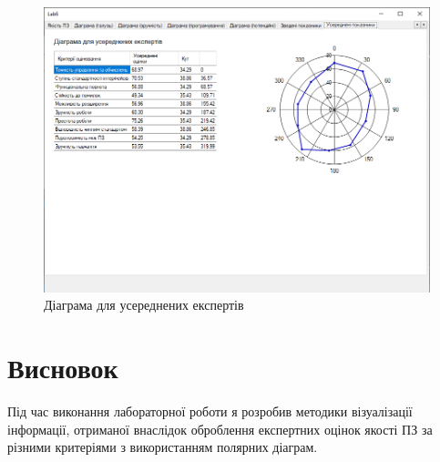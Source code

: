 \documentclass[14pt]{extreport}
\begin{document}
\begin{normalsize}
\begin{figure}[H]
	\centering
	\includegraphics[scale=0.55]{10}
	\caption{Діаграма для усереднених експертів}
\end{figure}

	
	\section*{Висновок}
	Під час виконання лабораторної роботи я розробив методики візуалізації інформації, отриманої
	внаслідок оброблення експертних оцінок якості ПЗ за різними критеріями з
	використанням полярних діаграм.
	
\end{normalsize}
\end{document}
